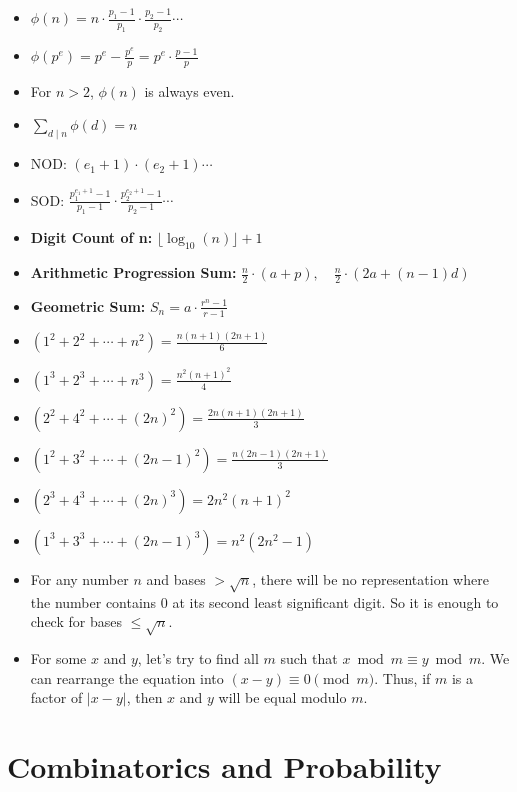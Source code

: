 {\footnotesize
\begin{itemize}
\item $\phi(n) = n \cdot \frac{p_1 - 1}{p_1} \cdot \frac{p_2 - 1}{p_2} \cdots$
\item $\phi(p^e) = p^e - \frac{p^e}{p} = p^e \cdot \frac{p-1}{p}$
\item For $n > 2$, $\phi(n)$ is always even.
\item $\sum_{d \mid n} \phi(d) = n$
\item NOD: $(e_1 + 1) \cdot (e_2 + 1) \cdots$
\item SOD: $\frac{p_1^{e_1 + 1} - 1}{p_1 - 1} \cdot \frac{p_2^{e_2 + 1} - 1}{p_2 - 1} \cdots$
\item \footnotesize \textbf{Digit Count of n: } $\lfloor \log_{10}(n) \rfloor + 1$
\item \footnotesize \textbf{Arithmetic Progression Sum: } $\frac{n}{2} \cdot (a + p), \quad \frac{n}{2} \cdot (2a + (n-1)d)$
\item \footnotesize \textbf{Geometric Sum: } $S_n = a \cdot \frac{r^n - 1}{r - 1}$
\item $(1^2 + 2^2 + \cdots + n^2) = \frac{n (n + 1) (2n + 1)}{6}$
\item $(1^3 + 2^3 + \cdots + n^3) = \frac{n^2 (n + 1)^2}{4}$
\item $(2^2 + 4^2 + \cdots + (2n)^2) = \frac{2 n (n + 1) (2n + 1)}{3}$
\item $(1^2 + 3^2 + \cdots + (2n - 1)^2) = \frac{n (2n - 1) (2n + 1)}{3}$
\item $(2^3 + 4^3 + \cdots + (2n)^3) = 2 n^2 (n + 1)^2$
\item $(1^3 + 3^3 + \cdots + (2n - 1)^3) = n^2 (2n^2 - 1)$
\item For any number $n$ and bases $> \sqrt{n}$, there will be no representation where the number contains 0 at its second least significant digit. So it is enough to check for bases $\le \sqrt{n}$.
\item For some $x$ and $y$, let's try to find all $m$ such that $x \bmod m \equiv y \bmod m$. We can rearrange the equation into $(x - y) \equiv 0 \pmod{m}$. Thus, if $m$ is a factor of $|x - y|$, then $x$ and $y$ will be equal modulo $m$.
\end{itemize}
}


\section{Combinatorics and Probability}
